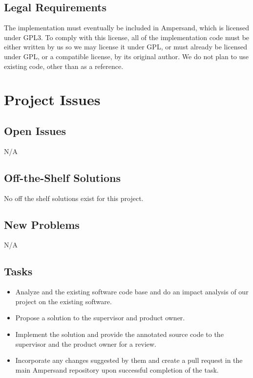 \documentclass[12pt]{report}
\begin{document}
\section{Legal Requirements}\label{sec:Legal}
The implementation must eventually be included in Ampersand, which is licensed
under GPL3. To comply with this license, all of the implementation code must be
either written by us so we may license it under GPL, or must already be licensed
under GPL, or a compatible license, by its original author. We do not plan to
use existing code, other than as a reference.
%
%
\chapter{Project Issues}\label{ch:issues}
\section{Open Issues}\label{sec:issues}
N/A%
\section{Off-the-Shelf Solutions}\label{sec:solutions}
No off the shelf solutions exist for this project.
\section{New Problems}\label{sec:NewProblems}
N/A%
\section{Tasks}\label{sec:Tasks}
\begin{itemize}
\item Analyze and the existing software code base and do an impact analysis of our project on the existing software.
\item Propose a solution to the supervisor and product owner.
\item Implement the solution and provide the  annotated source code to the supervisor and the product owner for a review.
\item Incorporate any changes suggested by them and create a pull request in the main Ampersand repository upon successful completion of the task.
\end{itemize}
%
\end{document}
